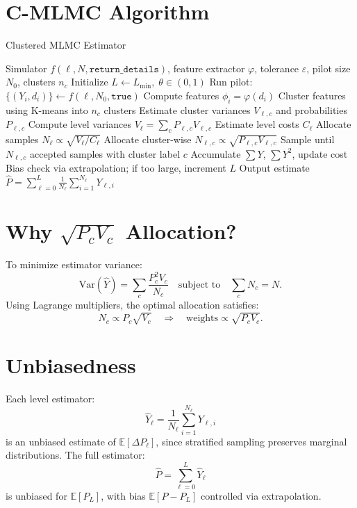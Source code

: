 \documentclass{article}
\begin{document}
\section{C-MLMC Algorithm}
\begin{algorithm}[H]
\caption{Clustered MLMC Estimator}
\label{alg:cmlmc}
\begin{algorithmic}[1]
\REQUIRE Simulator \( f(\ell, N, \texttt{return\_details}) \), feature extractor \( \varphi \), tolerance \( \varepsilon \), pilot size \( N_0 \), clusters \( n_c \)
\STATE Initialize \( L \leftarrow L_{\min},\;\theta \in (0,1) \)
    \STATE Run pilot: \( \{(Y_i, d_i)\} \leftarrow f(\ell, N_0, \texttt{true}) \)
    \STATE Compute features \( \phi_i = \varphi(d_i) \)
    \STATE Cluster features using K-means into \( n_c \) clusters
    \STATE Estimate cluster variances \( V_{\ell,c} \) and probabilities \( P_{\ell,c} \)
\ENDFOR
{}
    \STATE Compute level variances \( V_\ell = \sum_c P_{\ell,c} V_{\ell,c} \)
    \STATE Estimate level costs \( C_\ell \)
    \STATE Allocate samples \( N_\ell \propto \sqrt{V_\ell / C_\ell} \)
    \STATE Allocate cluster-wise \( N_{\ell,c} \propto \sqrt{P_{\ell,c} V_{\ell,c}} \)
        \STATE Sample until \( N_{\ell,c} \) accepted samples with cluster label \( c \)
        \STATE Accumulate \( \sum Y \), \( \sum Y^2 \), update cost
    \ENDFOR
    \STATE Bias check via extrapolation; if too large, increment \( L \)
\ENDWHILE
\STATE Output estimate \( \hat{P} = \sum_{\ell=0}^L \frac{1}{N_\ell} \sum_{i=1}^{N_\ell} Y_{\ell,i} \)
\end{algorithmic}
\end{algorithm}

\section{Why \(\sqrt{P_c V_c}\) Allocation?}
To minimize estimator variance:
\[
\mathrm{Var}(\hat{Y}) = \sum_c \frac{P_c^2 V_c}{N_c}
\quad \text{subject to} \quad \sum_c N_c = N.
\]
Using Lagrange multipliers, the optimal allocation satisfies:
\[
N_c \propto P_c \sqrt{V_c} \quad \Rightarrow \quad \text{weights} \propto \sqrt{P_c V_c}.
\]

\section{Unbiasedness}
Each level estimator:
\[
\hat{Y}_\ell = \frac{1}{N_\ell} \sum_{i=1}^{N_\ell} Y_{\ell,i}
\]
is an unbiased estimate of \( \mathbb{E}[\Delta P_\ell] \), since stratified sampling preserves marginal distributions. The full estimator:
\[
\hat{P} = \sum_{\ell=0}^L \hat{Y}_\ell
\]
is unbiased for \( \mathbb{E}[P_L] \), with bias \( \mathbb{E}[P - P_L] \) controlled via extrapolation.
\end{document}
